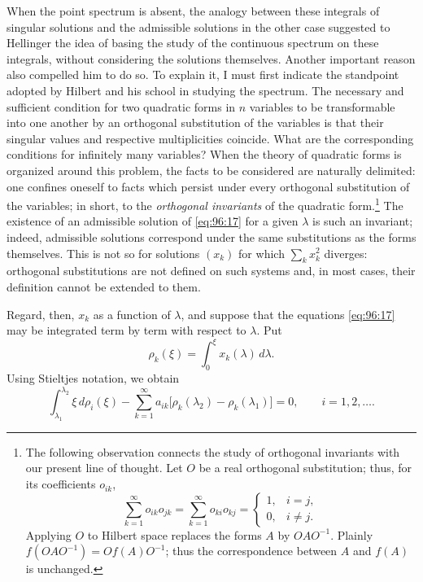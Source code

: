 \documentclass[
  paper=b5,
  fontsize=13pt,
  twoside=true,
  open=any,
  bookmarkpackage=false,
  chapterprefix=true,
  headings=normal
]{scrbook}
\theoremstyle{definition}
\begin{document}
When the point spectrum is absent, the analogy between these integrals of
singular solutions and the admissible solutions in the other case suggested
to Hellinger the idea of basing the study of the continuous spectrum on these
integrals, without considering the solutions themselves.  Another important
reason also compelled him to do so.  To explain it, I must first indicate the
standpoint adopted by Hilbert and his school in studying the spectrum.  The
necessary and sufficient condition for two quadratic forms in \(n\) variables
to be transformable into one another by an orthogonal substitution of the
variables is that their singular values and respective multiplicities
coincide.  What are the corresponding conditions for infinitely many
variables?  When the theory of quadratic forms is organized around this
problem, the facts to be considered are naturally delimited: one confines
oneself to facts which persist under every orthogonal substitution of the
variables; in short, to the \emph{orthogonal invariants} of the quadratic
form.\footnote{The following observation connects the study of orthogonal
invariants with our present line of thought.  Let \(O\) be a real orthogonal
substitution; thus, for its coefficients \(o_{ik}\),
\[
  \sum_{k=1}^{\infty}o_{ik}o_{jk}
  =\sum_{k=1}^{\infty}o_{ki}o_{kj}
  =\begin{cases}1,&i=j,\\0,&i\ne j.\end{cases}
\]
Applying \(O\) to Hilbert space replaces the forms \(A\) by
\(OAO^{-1}\).  Plainly
\(f(OAO^{-1})=Of(A)O^{-1}\); thus the correspondence between \(A\) and
\(f(A)\) is unchanged.}
The existence
of an admissible solution of \eqref{eq:96:17} for a given \(\lambda\) is such
an invariant; indeed, admissible solutions correspond under the same
substitutions as the forms themselves.  This is not so for solutions \((x_k)\)
for which \(\sum_kx_k^2\) diverges: orthogonal substitutions are not defined
on such systems and, in most cases, their definition cannot be extended to
them.

Regard, then, \(x_k\) as a function of \(\lambda\), and suppose that the
equations \eqref{eq:96:17} may be integrated term by term with respect to
\(\lambda\).  Put
\[
  \rho_k(\xi)=\int_0^\xi x_k(\lambda)\,d\lambda.
\]
Using Stieltjes notation, we obtain
\begin{equation}
  \int_{\lambda_1}^{\lambda_2}\xi\,d\rho_i(\xi)
  -\sum_{k=1}^{\infty}a_{ik}
  \bigl[\rho_k(\lambda_2)-\rho_k(\lambda_1)\bigr]=0,
  \qquad i=1,2,\ldots.
  \tag{24}\label{eq:101:24}
\end{equation}
\end{document}
